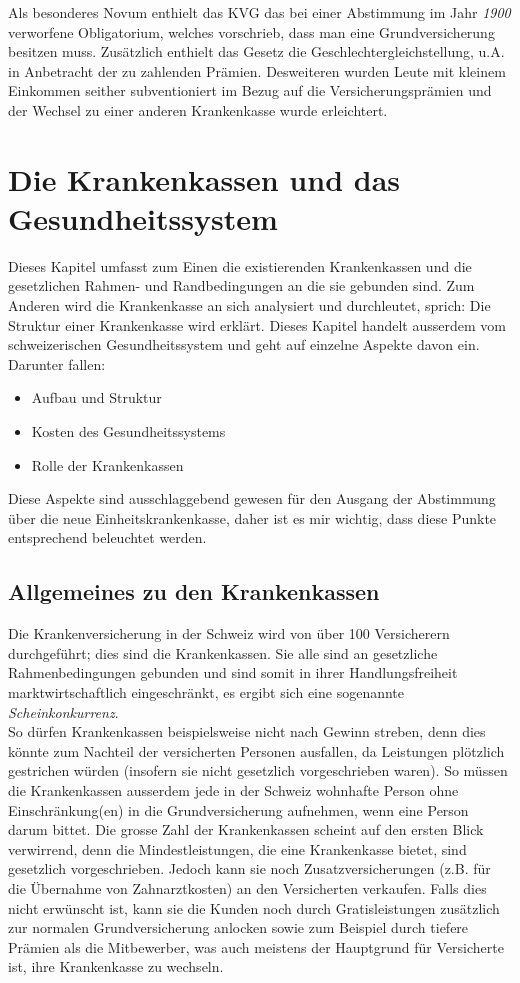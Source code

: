\documentclass[a4paper,12pt]{book}
\begin{document}
Als  besonderes Novum enthielt das KVG das bei einer Abstimmung im Jahr \emph{1900} verworfene Obligatorium, welches vorschrieb, dass man eine Grundversicherung besitzen muss.
Zusätzlich enthielt das Gesetz die Geschlechtergleichstellung, u.A. in Anbetracht der zu zahlenden Prämien.
Desweiteren wurden Leute mit kleinem Einkommen seither subventioniert im  Bezug auf die Versicherungsprämien und der Wechsel zu einer anderen Krankenkasse wurde erleichtert.
\chapter{Die Krankenkassen und das Gesundheitssystem}
Dieses Kapitel umfasst zum Einen die existierenden Krankenkassen und die gesetzlichen Rahmen- und Randbedingungen an die sie gebunden sind. Zum Anderen wird die Krankenkasse an sich analysiert und durchleutet, sprich: Die Struktur einer Krankenkasse wird erklärt.
Dieses Kapitel handelt ausserdem vom schweizerischen Gesundheitssystem und geht auf einzelne Aspekte davon ein. Darunter fallen:\newline
\begin{itemize}
\item Aufbau und Struktur
\item Kosten des Gesundheitssystems
\item Rolle der Krankenkassen
\end{itemize}
Diese Aspekte sind ausschlaggebend gewesen für den Ausgang der Abstimmung über die neue Einheitskrankenkasse, daher ist es mir wichtig, dass diese Punkte entsprechend beleuchtet werden.
\section{Allgemeines zu den Krankenkassen}
Die Krankenversicherung in der Schweiz wird von über 100 Versicherern durchgeführt; dies sind die Krankenkassen. Sie alle sind an gesetzliche Rahmenbedingungen gebunden und sind somit in ihrer Handlungsfreiheit marktwirtschaftlich eingeschränkt, es ergibt sich eine sogenannte \emph{Scheinkonkurrenz}.\\
So dürfen Krankenkassen beispielsweise nicht nach Gewinn streben, denn dies könnte zum Nachteil der versicherten Personen ausfallen, da Leistungen plötzlich gestrichen würden (insofern sie nicht gesetzlich vorgeschrieben waren). So müssen die Krankenkassen ausserdem jede in der Schweiz wohnhafte Person ohne Einschränkung(en) in die Grundversicherung aufnehmen, wenn eine Person darum bittet. Die grosse Zahl der Krankenkassen scheint auf den ersten Blick verwirrend, denn die Mindestleistungen, die eine Krankenkasse bietet, sind gesetzlich vorgeschrieben. Jedoch kann sie noch Zusatzversicherungen (z.B. für die Übernahme von Zahnarztkosten) an den Versicherten verkaufen. Falls dies nicht erwünscht ist, kann sie die Kunden noch durch Gratisleistungen zusätzlich zur normalen Grundversicherung anlocken sowie zum Beispiel durch tiefere Prämien als die Mitbewerber, was auch meistens der Hauptgrund für Versicherte ist, ihre Krankenkasse zu wechseln.\\
\end{document}
